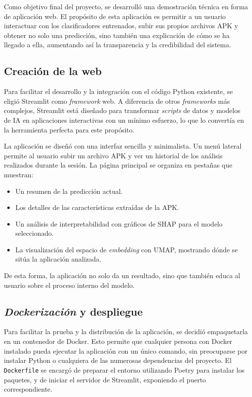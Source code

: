 Como objetivo final del proyecto, se desarrolló una demostración técnica en forma de aplicación web. El propósito de esta aplicación es permitir a un usuario interactuar con los clasificadores entrenados, subir sus propios archivos APK y obtener no solo una predicción, sino también una explicación de cómo se ha llegado a ella, aumentando así la transparencia y la credibilidad del sistema.

\subsection{Creación de la web}

Para facilitar el desarrollo y la integración con el código Python existente, se eligió Streamlit como \textit{framework} web. A diferencia de otros \textit{frameworks} más complejos, Streamlit está diseñado para transformar \textit{scripts} de datos y modelos de IA en aplicaciones interactivas con un mínimo esfuerzo, lo que lo convertía en la herramienta perfecta para este propósito.

La aplicación se diseñó con una interfaz sencilla y minimalista. Un menú lateral permite al usuario subir un archivo APK y ver un historial de los análisis realizados durante la sesión. La página principal se organiza en pestañas que muestran:

\begin{itemize}
	\item Un resumen de la predicción actual.
	
	\item Los detalles de las características extraídas de la APK.
	
	\item Un análisis de interpretabilidad con gráficos de SHAP para el modelo seleccionado.
	
	\item La visualización del espacio de \textit{embedding} con UMAP, mostrando dónde se sitúa la aplicación analizada.
\end{itemize}

De esta forma, la aplicación no solo da un resultado, sino que también educa al usuario sobre el proceso interno del modelo.

\subsection{\textit{Dockerización} y despliegue}

Para facilitar la prueba y la distribución de la aplicación, se decidió empaquetarla en un contenedor de Docker. Esto permite que cualquier persona con Docker instalado pueda ejecutar la aplicación con un único comando, sin preocuparse por instalar Python o cualquiera de las numerosas dependencias del proyecto. El \texttt{Dockerfile} se encargó de preparar el entorno utilizando Poetry para instalar los paquetes, y de iniciar el servidor de Streamlit, exponiendo el puerto correspondiente.

